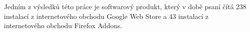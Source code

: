 
Jedním z výsledků této práce je softwarový produkt, který v době psaní čítá 238 instalací z internetového obchodu Google Web Store a 43 instalací z internetového obchodu Firefox Addons.






